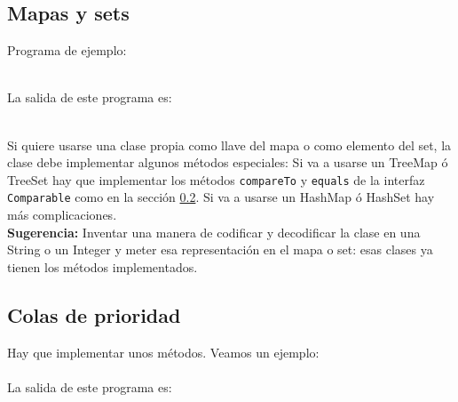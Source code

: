 \documentclass[10pt,letterpaper,twocolumn,twosided]{article}
\newcommand{\codigofuente}[1]{

\dotfill
}
\begin{document}
\subsection{Mapas y sets}
Programa de ejemplo:
\codigofuente{./src/java/maps_sets.java} \\
La salida de este programa es: \\
\bigskip
\ttfamily
{}
\\ \normalfont\normalsize
\bigskip

Si quiere usarse una clase propia como llave del mapa o como elemento del set, la clase debe implementar
algunos métodos especiales: Si va a usarse un TreeMap ó TreeSet hay que implementar los métodos \texttt{compareTo} y
\texttt{equals} de la interfaz \texttt{Comparable} como en la sección \ref{colas_de_prioridad_java}. Si va a usarse
un HashMap ó HashSet hay más complicaciones.\\
\smallskip
\textbf{Sugerencia:} Inventar una manera de codificar y decodificar la clase en una String o un Integer y meter esa representación en el mapa o set: esas clases ya tienen los métodos implementados.

\subsection{Colas de prioridad}
\label{colas_de_prioridad_java}
Hay que implementar unos métodos. Veamos un ejemplo: \\
\codigofuente{./src/java/priority_queue.java}\\
La salida de este programa es: \\

\ttfamily
{}
 \normalfont\normalsize
\end{document}
